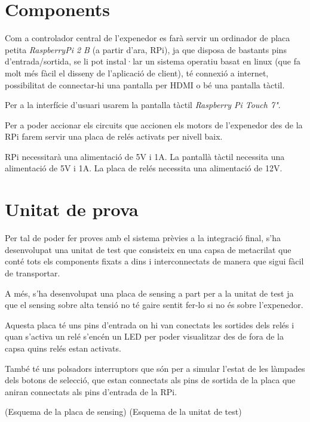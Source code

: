 \section{Components}
Com a controlador central de l'expenedor es farà servir un ordinador de placa petita \textit{RaspberryPi 2 B} (a partir d'ara, RPi), ja que disposa de bastants pins d'entrada/sortida, se li pot instal·lar un sistema operatiu basat en linux (que fa molt més fàcil el disseny de l'aplicació de client), té connexió a internet, possibilitat de connectar-hi una pantalla per HDMI o bé una pantalla tàctil.

Per a la interfície d'usuari usarem la pantalla tàctil \textit{Raspberry Pi Touch 7"}.

Per a poder accionar els circuits que accionen els motors de l'expenedor des de la RPi farem servir una placa de relés activats per nivell baix.



RPi necessitarà una alimentació de 5V i 1A.
La pantallà tàctil necessita una alimentació de 5V i 1A.
La placa de relés necessita una alimentació de 12V.

\section{Unitat de prova}
Per tal de poder fer proves amb el sistema prèvies a la integració final, s'ha desenvolupat una unitat de test que consisteix en una capsa de metacrilat que conté tots els components fixats a dins i interconnectats de manera que sigui fàcil de transportar.

A més, s'ha desenvolupat una placa de sensing a part per a la unitat de test ja que el sensing sobre alta tensió no té gaire sentit fer-lo si no és sobre l'expenedor.

Aquesta placa té uns pins d'entrada on hi van conectats les sortides dels relés i quan s'activa un relé s'encén un LED per poder visualitzar des de fora de la capsa quins relés estan activats.

També té uns polsadors interruptors que són per a simular l'estat de les làmpades dels botons de selecció, que estan connectats als pins de sortida de la placa que aniran connectats als pins d'entrada de la RPi.

(Esquema de la placa de sensing)
(Esquema de la unitat de test)

